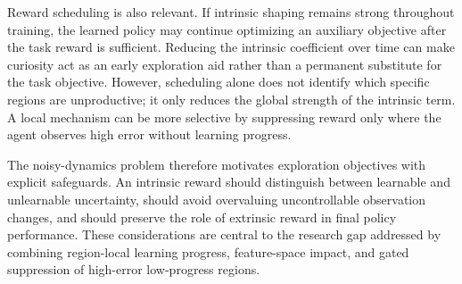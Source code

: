 Reward scheduling is also relevant.
If intrinsic shaping remains strong throughout training, the learned policy may continue optimizing an auxiliary objective after the task reward is sufficient.
Reducing the intrinsic coefficient over time can make curiosity act as an early exploration aid rather than a permanent substitute for the task objective.
However, scheduling alone does not identify which specific regions are unproductive; it only reduces the global strength of the intrinsic term.
A local mechanism can be more selective by suppressing reward only where the agent observes high error without learning progress.

The noisy-dynamics problem therefore motivates exploration objectives with explicit safeguards.
An intrinsic reward should distinguish between learnable and unlearnable uncertainty, should avoid overvaluing uncontrollable observation changes, and should preserve the role of extrinsic reward in final policy performance.
These considerations are central to the research gap addressed by combining region-local learning progress, feature-space impact, and gated suppression of high-error low-progress regions.